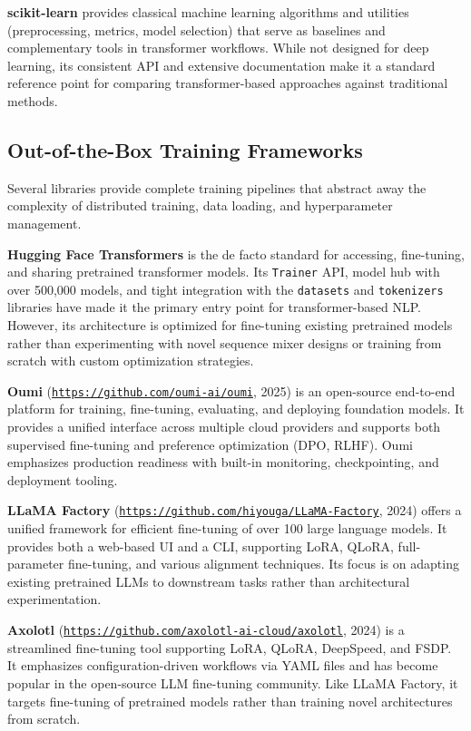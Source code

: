 \textbf{scikit-learn} \citep{pedregosa_scikit-learn_2011} provides classical machine learning algorithms and utilities (preprocessing, metrics, model selection) that serve as baselines and complementary tools in transformer workflows. While not designed for deep learning, its consistent API and extensive documentation make it a standard reference point for comparing transformer-based approaches against traditional methods.

\subsection{Out-of-the-Box Training Frameworks}

Several libraries provide complete training pipelines that abstract away the complexity of distributed training, data loading, and hyperparameter management.

\textbf{Hugging Face Transformers} \citep{wolf_huggingface_2020} is the de facto standard for accessing, fine-tuning, and sharing pretrained transformer models. Its \texttt{Trainer} API, model hub with over 500,000 models, and tight integration with the \texttt{datasets} and \texttt{tokenizers} libraries have made it the primary entry point for transformer-based NLP. However, its architecture is optimized for fine-tuning existing pretrained models rather than experimenting with novel sequence mixer designs or training from scratch with custom optimization strategies.

\textbf{Oumi} (\texttt{\url{https://github.com/oumi-ai/oumi}}, 2025) is an open-source end-to-end platform for training, fine-tuning, evaluating, and deploying foundation models. It provides a unified interface across multiple cloud providers and supports both supervised fine-tuning and preference optimization (DPO, RLHF). Oumi emphasizes production readiness with built-in monitoring, checkpointing, and deployment tooling.

\textbf{LLaMA Factory} (\texttt{\url{https://github.com/hiyouga/LLaMA-Factory}}, 2024) offers a unified framework for efficient fine-tuning of over 100 large language models. It provides both a web-based UI and a CLI, supporting LoRA, QLoRA, full-parameter fine-tuning, and various alignment techniques. Its focus is on adapting existing pretrained LLMs to downstream tasks rather than architectural experimentation.

\textbf{Axolotl} (\texttt{\url{https://github.com/axolotl-ai-cloud/axolotl}}, 2024) is a streamlined fine-tuning tool supporting LoRA, QLoRA, DeepSpeed, and FSDP. It emphasizes configuration-driven workflows via YAML files and has become popular in the open-source LLM fine-tuning community. Like LLaMA Factory, it targets fine-tuning of pretrained models rather than training novel architectures from scratch.

